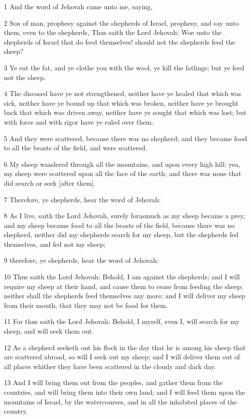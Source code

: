 \par 1 And the word of Jehovah came unto me, saying,
\par 2 Son of man, prophesy against the shepherds of Israel, prophesy, and say unto them, even to the shepherds, Thus saith the Lord Jehovah: Woe unto the shepherds of Israel that do feed themselves! should not the shepherds feed the sheep?
\par 3 Ye eat the fat, and ye clothe you with the wool, ye kill the fatlings; but ye feed not the sheep.
\par 4 The diseased have ye not strengthened, neither have ye healed that which was sick, neither have ye bound up that which was broken, neither have ye brought back that which was driven away, neither have ye sought that which was lost; but with force and with rigor have ye ruled over them.
\par 5 And they were scattered, because there was no shepherd; and they became food to all the beasts of the field, and were scattered.
\par 6 My sheep wandered through all the mountains, and upon every high hill: yea, my sheep were scattered upon all the face of the earth; and there was none that did search or seek [after them].
\par 7 Therefore, ye shepherds, hear the word of Jehovah:
\par 8 As I live, saith the Lord Jehovah, surely forasmuch as my sheep became a prey, and my sheep became food to all the beasts of the field, because there was no shepherd, neither did my shepherds search for my sheep, but the shepherds fed themselves, and fed not my sheep;
\par 9 therefore, ye shepherds, hear the word of Jehovah:
\par 10 Thus saith the Lord Jehovah: Behold, I am against the shepherds; and I will require my sheep at their hand, and cause them to cease from feeding the sheep; neither shall the shepherds feed themselves any more; and I will deliver my sheep from their mouth, that they may not be food for them.
\par 11 For thus saith the Lord Jehovah: Behold, I myself, even I, will search for my sheep, and will seek them out.
\par 12 As a shepherd seeketh out his flock in the day that he is among his sheep that are scattered abroad, so will I seek out my sheep; and I will deliver them out of all places whither they have been scattered in the cloudy and dark day.
\par 13 And I will bring them out from the peoples, and gather them from the countries, and will bring them into their own land; and I will feed them upon the mountains of Israel, by the watercourses, and in all the inhabited places of the country.
